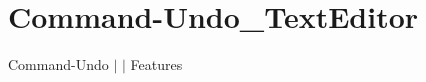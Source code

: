 \chapter{Command-\/\+Undo\+\_\+\+Text\+Editor }
\hypertarget{md__docs_2_text_editor_2_features_2_command-_undo___text_editor}{}\label{md__docs_2_text_editor_2_features_2_command-_undo___text_editor}
Command-\/\+Undo \texorpdfstring{$\vert$}{|}  \texorpdfstring{$\vert$}{|} Features



 